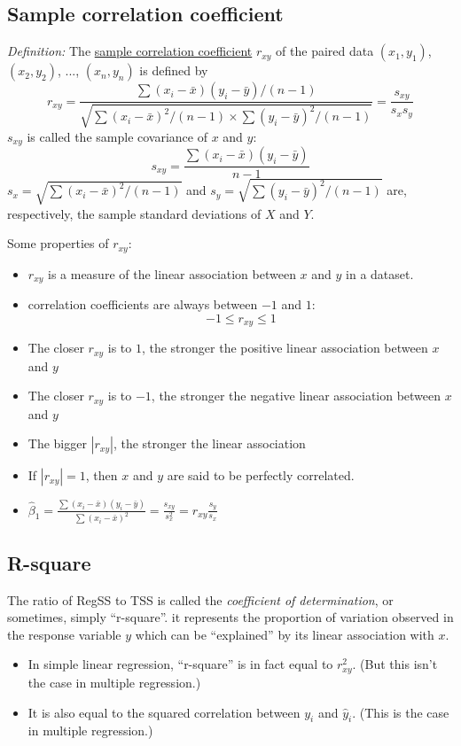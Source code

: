 \subsection*{Sample correlation coefficient}

{\it Definition: } The \underline{sample correlation coefficient} $r_{xy}$ of the paired data $(x_1, y_1)$, $(x_2, y_2)$, ..., $(x_n, y_n)$ is defined by
$$
r_{xy} = \frac{\sum{(x_i - \bar{x})(y_i - \bar{y})}/(n - 1)}{\sqrt{\sum(x_i - \bar{x})^2/(n - 1) \times \sum(y_i - \bar{y})^2/(n - 1)}} = \frac{s_{xy}}{s_x s_y}
$$
%
$s_{xy}$ is called the sample covariance of $x$ and $y$:
$$
s_{xy} = \frac{\sum{(x_i - \bar{x})(y_i - \bar{y})}}{n - 1}
$$
$s_x = \sqrt{\sum(x_i - \bar{x})^2/(n - 1)}$ and $s_y = \sqrt{\sum(y_i - \bar{y})^2/(n - 1)}$ are, respectively, the sample standard deviations of $X$ and $Y$.

Some properties of $r_{xy}$:
\begin{itemize}
  \item $r_{xy}$ is a measure of the linear association between $x$ and $y$ in a dataset.
  \item correlation coefficients are always between $-1$ and $1$:
  $$
  -1 \le r_{xy} \le 1
  $$
  \item The closer $r_{xy}$ is to $1$, the stronger the positive linear association between $x$ and $y$
  \item The closer $r_{xy}$ is to $-1$, the stronger the negative linear association between $x$ and $y$
  \item The bigger $|r_{xy}|$, the stronger the linear association
  \item If $|r_{xy}| = 1$, then $x$ and $y$ are said to be perfectly correlated.
  \item $\hat{\beta}_1 = \frac{\sum(x_i - \bar{x})(y_i - \bar{y})}{\sum(x_i - \bar{x})^2} = \frac{s_{xy}}{s_x^2} = r_{xy} \frac{s_y}{s_x}$
\end{itemize}



\subsection*{R-square}

The ratio of RegSS to TSS is called the {\it coefficient of determination}, or sometimes, simply ``r-square''.  it represents the proportion of variation observed in the response variable $y$ which can be ``explained'' by its linear association with $x$.

\begin{itemize}
  \item In simple linear regression, ``r-square'' is in fact equal to $r^2_{xy}$. (But this isn't the case in multiple regression.)
  \item It is also equal to the squared correlation between $y_i$ and $\hat{y}_i$. (This is the case in multiple regression.)
\end{itemize}

